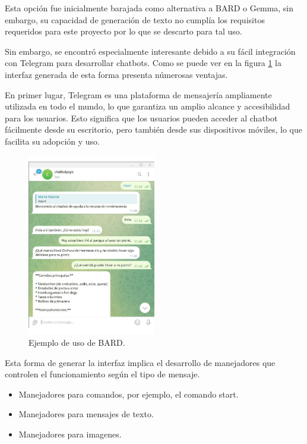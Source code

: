 Esta opción fue inicialmente barajada como alternativa a BARD o Gemma, sin embargo, su capacidad de generación de texto no cumplía los requisitos requeridos para este proyecto por lo que se descarto para tal uso. 

Sin embargo, se encontró especialmente interesante debido a su fácil integración con Telegram para desarrollar chatbots. Como se puede ver en la figura \ref{fig:ejemploRASATELEGRAM} la interfaz generada de esta forma presenta númerosas ventajas. 

En primer lugar, Telegram es una plataforma de mensajería ampliamente utilizada en todo el mundo, lo que garantiza un amplio alcance y accesibilidad para los usuarios. Esto significa que los usuarios pueden acceder al chatbot fácilmente desde su escritorio, pero también desde sus dispositivos móviles, lo que facilita su adopción y uso.

\begin{figure}[h]
	\centering
	\includegraphics[width=0.5\textwidth]{Imagenes/telegram1}
	\caption{ Ejemplo de uso de BARD.}
	\label{fig:ejemploRASATELEGRAM}
\end{figure}

Esta forma de generar la interfaz implica el desarrollo de manejadores que controlen el funcionamiento según el tipo de mensaje. 
	
\begin{itemize}
	\item Manejadores para comandos, por ejemplo, el comando start.
	
	\item Manejadores para mensajes de texto.
	
	\item Manejadores para imagenes. 
\end{itemize}
	
